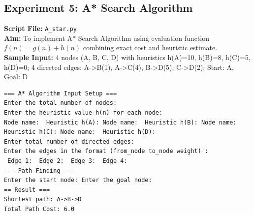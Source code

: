 \subsection*{Experiment 5: A* Search Algorithm}
\textbf{Script File:} \texttt{A_star.py} \\[4pt]
\textbf{Aim:} To implement A* Search Algorithm using evaluation function $f(n) = g(n) + h(n)$ combining exact cost and heuristic estimate. \\[4pt]
\textbf{Sample Input:} 4 nodes (A, B, C, D) with heuristics h(A)=10, h(B)=8, h(C)=5, h(D)=0; 4 directed edges: A->B(1), A->C(4), B->D(5), C->D(2); Start: A, Goal: D \\[6pt]
\begin{tcolorbox}[colback=black!5!white,colframe=black!75!white,title=Terminal Execution Output - A* Search Algorithm]
\begin{verbatim}
=== A* Algorithm Input Setup ===
Enter the total number of nodes: 
Enter the heuristic value h(n) for each node:
Node name:  Heuristic h(A): Node name:  Heuristic h(B): Node name:  Heuristic h(C): Node name:  Heuristic h(D): 
Enter total number of directed edges:
Enter the edges in the format (from_node to_node weight)':
 Edge 1:  Edge 2:  Edge 3:  Edge 4: 
--- Path Finding ---
Enter the start node: Enter the goal node: 
== Result ===
Shortest path: A->B->D
Total Path Cost: 6.0
\end{verbatim}
\end{tcolorbox}

